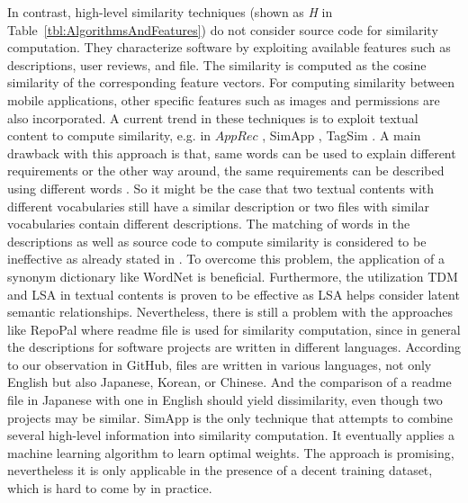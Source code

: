 In contrast, high-level similarity techniques (shown as \textit{H} in Table~\ref{tbl:AlgorithmsAndFeatures}) do not consider source code for similarity computation. They characterize software by exploiting available features such as descriptions, user reviews, and  file. The similarity is computed as the cosine similarity of the corresponding feature vectors. For computing similarity between mobile applications, other specific features such as images and permissions are also incorporated. A current trend in these techniques is to exploit textual content to compute similarity, e.g. in $AppRec$ \cite{confairsBhandariSDJ13}, SimApp \cite{Chen:2015:SFD:2684822.2685305}, TagSim \cite{Lo:2012:DSA:2473496.2473616}. A main drawback with this approach is that, same words can be used to explain different requirements or the other way around, the same requirements can be described using different words \cite{10.1109/APSEC.2004.69}. So it might be the case that two textual contents with different vocabularies still have a similar description or two files with similar vocabularies contain different descriptions. The matching of words in the descriptions as well as source code to compute similarity is considered to be ineffective as already stated in \cite{McMillan:2012:DSS:2337223.2337267}. To overcome this problem, the application of a synonym dictionary like WordNet \cite{Miller:1995:WLD:219717.219748} is beneficial. Furthermore, the utilization TDM and LSA in textual contents is proven to be effective as LSA helps consider latent semantic relationships. Nevertheless, there is still a problem with the approaches like RepoPal where readme file is used for similarity computation, since in general the descriptions for software projects are written in different languages. According to our observation in GitHub,  files are written in various languages, \eg not only English but also Japanese, Korean, or Chinese. And the comparison of a readme file in Japanese with one in English should yield dissimilarity, even though two projects may be similar. SimApp \cite{Chen:2015:SFD:2684822.2685305} is the only technique that attempts to combine several high-level information into similarity computation. It eventually applies a machine learning algorithm to learn optimal weights. The approach is promising, nevertheless it is only applicable in the presence of a decent training dataset, which is hard to come by in practice.

